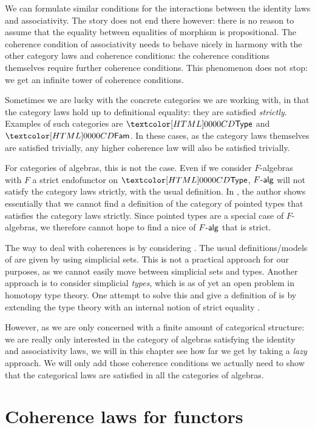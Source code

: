 We can formulate similar conditions for the interactions between the
identity laws and associativity. The story does not end there however:
there is no reason to assume that the equality between equalities of
morphism is propositional. The coherence condition of associativity
needs to behave nicely in harmony with the other category laws and
coherence conditions: the coherence conditions themselves require
further coherence conditions. This phenomenon does not stop: we get an
infinite tower of coherence conditions.

Sometimes we are lucky with the concrete categories we are working
with, in that the category laws hold up to definitional equality: they
are satisfied \emph{strictly}. Examples of such categories are $\Type$
and $\Fam$. In these cases, as the category laws themselves are
satisfied trivially, any higher coherence law will also be satisfied
trivially.

For categories of algebras, this is not the case. Even if we consider
$F$-algebras with $F$ a strict endofunctor on $\Type$, $\algcat{F}$
will not satisfy the category laws strictly, with the usual
definition. In \cite{Cranch2013}, the author shows essentially that we
cannot find a definition of the category of pointed types that
satisfies the category laws strictly. Since pointed types are a
special case of $F$-algebras, we therefore cannot hope to find a nice
of $\algcat{F}$ that is strict.

The way to deal with coherences is by considering \inftycats
\cite{Camarena2013}. The usual definitions/models of \inftycats are
given by using simplicial sets. This is not a practical approach for
our purposes, as we cannot easily move between simplicial sets and
types. Another approach is to consider simplicial \emph{types}, which
is as of yet an open problem in homotopy type theory. One attempt to
solve this and give a definition of \inftycats is by extending the
type theory with an internal notion of strict equality
\cite{Altenkirch2016,Altenkirch2016iii}.

However, as we are only concerned with a finite amount of categorical
structure: we are really only interested in the category of algebras
satisfying the identity and associativity laws, we will in this
chapter see how far we get by taking a \emph{lazy} approach. We will
only add those coherence conditions we actually need to show that the
categorical laws are satisfied in all the categories of algebras.

\section{Coherence laws for functors}

